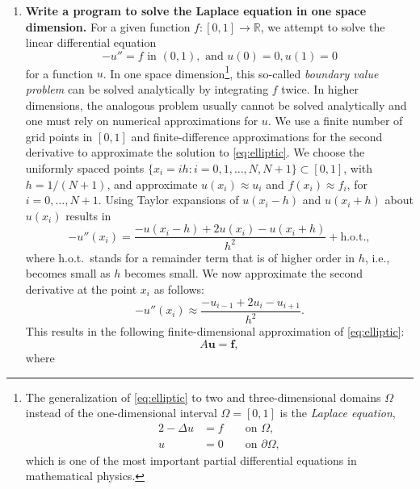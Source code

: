 \documentclass[11pt]{article}
\newcommand{\bs}{\boldsymbol}
\begin{document}
\begin{enumerate}
\item {\bf Write a program to solve the Laplace equation in one space
  dimension.} For a given function $f:[0,1]\to\mathbb R$, we attempt to
  solve the linear differential equation
  \begin{equation}\label{eq:elliptic}
    -u'' = f \text { in } (0,1), \text{ and } u(0) = 0, u(1) =
    0
  \end{equation}
  for a function $u$. In one space dimension\footnote{The
    generalization of \eqref{eq:elliptic} to two and three-dimensional
    domains $\Omega$ instead of the one-dimensional interval $\Omega =
    [0,1]$ is the \emph{Laplace equation},
    \begin{alignat*}{2}
      -\Delta u &= f && \text{ on } \Omega,\\
      u&=0&& \text{ on } \partial\Omega,
    \end{alignat*}
    which is one of the most important partial differential equations
    in mathematical physics.}, this so-called \emph{boundary value
    problem} can be solved analytically by integrating $f$ twice. In
  higher dimensions, the analogous problem usually cannot be solved
  analytically and one must rely on numerical approximations for $u$.
  We use  a finite number of grid points in $[0,1]$ and
  finite-difference approximations for the second derivative to
  approximate the solution to \eqref{eq:elliptic}. We choose the
  uniformly spaced points $\{x_i=ih:i=0,1,\ldots,N,N+1\}\subset
  [0,1]$, with $h = 1/(N+1)$, and approximate $u(x_i)\approx u_i$ and
  $f(x_i)\approx f_i$, for $i=0,\ldots, N+1$. Using Taylor expansions
  of $u(x_i-h)$ and $u(x_i+h)$ about $u(x_i)$ results in
  \begin{equation*}%
    -u''(x_i) = \frac{-u(x_i-h) + 2u(x_i) - u(x_i+h)}{h^2} + \text{h.o.t.},
  \end{equation*}
  where h.o.t.\ stands for a remainder term that is of higher order in
  $h$, i.e., becomes small as $h$ becomes small.
  We now approximate the second derivative
  at the point $x_i$ as follows:
  \begin{equation*}%
    -u''(x_i)  \approx  \frac{-u_{i-1} + 2u_i - u_{i+1}}{h^2}.
  \end{equation*}
  This results in the following
  finite-dimensional approximation of \eqref{eq:elliptic}:
  \begin{equation}\label{eq:Au=f}
    A\bs u = \bs f,
  \end{equation}
  where
  \begin{equation*}

\end{equation*}
\end{enumerate}
\end{document}
